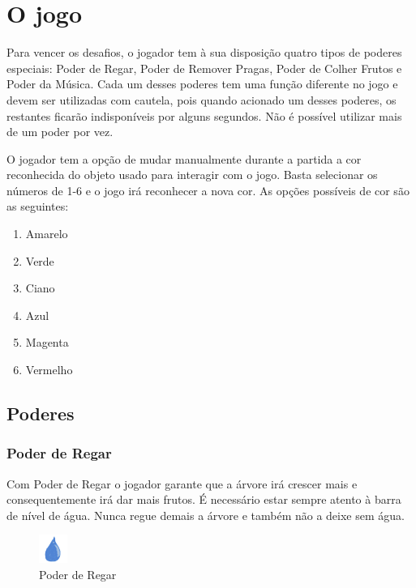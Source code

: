 \documentclass[12pt]{article}
\begin{document}
\section{O jogo}

 Para vencer os desafios, o jogador tem \`a sua disposi\c c\~ao quatro tipos de poderes especiais: Poder de Regar,
 Poder de Remover Pragas, Poder de Colher Frutos e Poder da M\'usica. Cada um desses poderes tem uma fun\c c\~ao
 diferente no jogo e devem ser utilizadas com cautela, pois quando acionado um desses poderes, os restantes ficar\~ao
 indispon\'iveis por alguns segundos. N\~ao \'e poss\'ivel utilizar mais de um poder por vez.

 O jogador tem a op\c c\~ao de mudar manualmente durante a partida a cor reconhecida do objeto usado para interagir com o jogo.
 Basta selecionar os n\'umeros de 1-6 e o jogo ir\'a reconhecer a nova cor. As op\c c\~oes poss\'iveis de cor s\~ao as
 seguintes:
 
 \begin{enumerate}
 	\item Amarelo
 	\item Verde
 	\item Ciano
 	\item Azul
 	\item Magenta
 	\item Vermelho
 \end{enumerate}
 
 \subsection{Poderes}
 \subsubsection{Poder de Regar} 
 Com Poder de Regar o jogador garante que a \'arvore ir\'a crescer mais e consequentemente ir\'a
 dar mais frutos. \'E necess\'ario estar sempre atento \`a barra de n\'ivel de \'agua. Nunca regue demais a
 \'arvore e tamb\'em n\~ao a deixe sem \'agua.
 
	\begin{figure}[ht!]
	\begin{center}
		\includegraphics[scale=1]{img/icone_gota.png}
		\footnotesize \caption{Poder de Regar }
	\end{center}
	\end{figure}	
  
\end{document}
